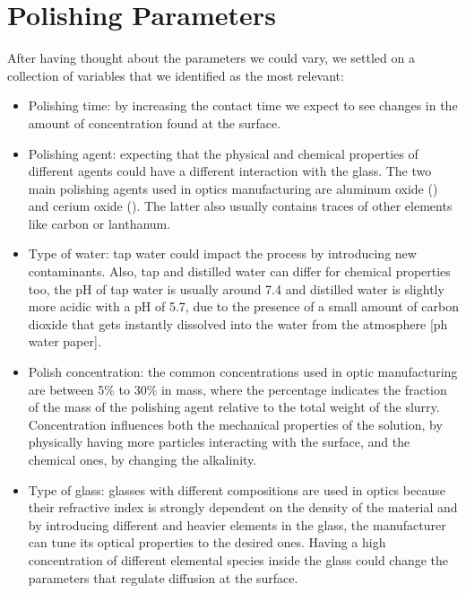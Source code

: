\section{Polishing Parameters}
\label{sec:pol_parameter}
After having thought about the parameters we could vary, we settled on a collection of variables that we identified as the most relevant:
\begin{itemize}
    \item Polishing time: by increasing the contact time we expect to see changes in the amount of concentration found at the surface.
    \item Polishing agent: expecting that the physical and chemical properties of different agents could have a different interaction with the glass. The two main polishing agents used in optics manufacturing are aluminum oxide () and cerium oxide (). The latter also usually contains traces of other elements like carbon or lanthanum.
    \item Type of water: tap water could impact the process by introducing new contaminants. Also, tap and distilled water can differ for chemical properties too, the pH of tap water is usually around 7.4 and distilled water is slightly more acidic with a pH of 5.7, due to the presence of a small amount of carbon dioxide that gets instantly dissolved into the water from the atmosphere [ph water paper].
    \item Polish concentration: the common concentrations used in optic manufacturing are between 5\% to 30\% in mass, where the percentage indicates the fraction of the mass of the polishing agent relative to the total weight of the slurry. Concentration influences both the mechanical properties of the solution, by physically having more particles interacting with the surface, and the chemical ones, by changing the alkalinity.
    \item Type of glass: glasses with different compositions are used in optics because their refractive index is strongly dependent on the density of the material and by introducing different and heavier elements in the glass, the manufacturer can tune its optical properties to the desired ones. Having a high concentration of different elemental species inside the glass could change the parameters that regulate diffusion at the surface.
\end{itemize}

